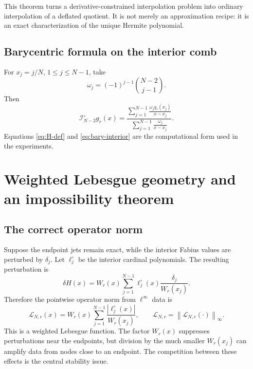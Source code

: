 \documentclass[11pt,oneside]{article}
\theoremstyle{definition}
\theoremstyle{remark}
\newcommand{\Lag}{\mathcal I}
\newcommand{\norm}[1]{\left\lVert #1\right\rVert}
\newcommand{\abs}[1]{\left\lvert #1\right\rvert}
\begin{document}
This theorem turns a derivative-constrained interpolation problem into ordinary interpolation of a deflated quotient.  It is not merely an approximation recipe: it is an exact characterization of the unique Hermite polynomial.

\subsection{Barycentric formula on the interior comb}

For $x_j=j/N$, $1\le j\le N-1$, take
\begin{equation}
 \omega_j=(-1)^{j-1}\binom{N-2}{j-1}.
 \label{eq:interior-weights}
\end{equation}
Then
\begin{equation}
 \Lag_{N-2}^{\circ}g_r(x)=
 \frac{\displaystyle\sum_{j=1}^{N-1}\frac{\omega_j g_r(x_j)}{x-x_j}}
 {\displaystyle\sum_{j=1}^{N-1}\frac{\omega_j}{x-x_j}}.
 \label{eq:bary-interior}
\end{equation}
Equations \eqref{eq:H-def} and \eqref{eq:bary-interior} are the computational form used in the experiments.

\section{Weighted Lebesgue geometry and an impossibility theorem}
\label{sec:weighted-lebesgue}

\subsection{The correct operator norm}

Suppose the endpoint jets remain exact, while the interior Fabius values are perturbed by $\delta_j$.  Let $\ell_j^{\circ}$ be the interior cardinal polynomials.  The resulting perturbation is
\begin{equation}
 \delta H(x)=W_r(x)\sum_{j=1}^{N-1}
 \ell_j^{\circ}(x)\frac{\delta_j}{W_r(x_j)}.
 \label{eq:perturbation}
\end{equation}
Therefore the pointwise operator norm from $\ell^\infty$ data is
\begin{equation}
 \mathscr L_{N,r}(x)=W_r(x)\sum_{j=1}^{N-1}
 \frac{\abs{\ell_j^{\circ}(x)}}{W_r(x_j)},
 \qquad
 \mathscr L_{N,r}=\norm{\mathscr L_{N,r}(\cdot)}_\infty.
 \label{eq:weighted-lebesgue}
\end{equation}
This is a weighted Lebesgue function.  The factor $W_r(x)$ suppresses perturbations near the endpoints, but division by the much smaller $W_r(x_j)$ can amplify data from nodes close to an endpoint.  The competition between these effects is the central stability issue.
\end{document}

